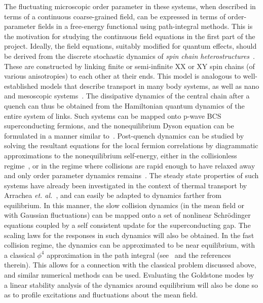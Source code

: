 \documentclass[a4paper,11pt,color]{article}
\begin{document}
The fluctuating microscopic order parameter in these systems, when  described in terms of a continuous coarse-grained field, can be expressed in terms of order-parameter fields in a free-energy functional using path-integral methods. This is the motivation for studying the continuous field equations in the first part of the project. Ideally, the field equations, suitably modified for quantum effects, should be derived from the discrete stochastic dynamics of \textit{spin chain heterostructures}~\cite{arrachea}. These are  constructed by linking finite or semi-infinite XX or XY spin chains (of various anisotropies) to each other at their ends. This model is analogous to well-established models that describe transport in many body systems, as well as nano and mesoscopic systems~\cite{arrachea,openspin, imry}. The dissipative dynamics of the central chain after a quench can thus be obtained from the Hamiltonian quantum dynamics of the entire system of links. Such systems can be mapped onto p-wave BCS superconducting fermions, and the nonequilibrium Dyson equation can be formulated in a manner similar to~\cite{gorkov, volkov}. Post-quench dynamics can be studied by solving the resultant equations for the local fermion correlations by diagrammatic approximations to the nonequilibrium self-energy, either in the collisionless regime~\cite{volkov,
ncnsd2012}, or in the regime where collisions are rapid enough to have relaxed away and only order parameter dynamics remains~\cite{ncnsd2012}. The steady state properties of such systems have already been investigated in the context of thermal transport by Arrachea \textit{et. al.}~\cite{arrachea}, and can easily be adapted to dynamics farther from equilibrium. In this manner, the slow collision dynamics (in the mean field or with Gaussian fluctuations) can be mapped onto a set of nonlinear Schr\"odinger equations coupled by a self consistent update for the superconducting gap. The scaling laws for the responses in such dynamics will also be obtained.  In the fast collision regime, the dynamics can be approximated to be near equilibrium, with a classical $\phi^4$ approximation in the path integral (see~\cite{colrev} and the references therein). This allows for a connection with the classical problem discussed above, and similar numerical methods can be used. Evaluating the Goldstone modes by a linear 
stability analysis of the dynamics around equilibrium will also be done so as to profile excitations and fluctuations about the mean field.
\end{document}
